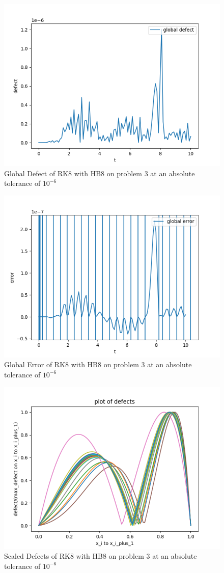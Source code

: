 \documentclass{article}
\begin{document}
\begin{figure}[H]
\centering
\includegraphics[width=0.7\linewidth]{./figures/rk8_with_hb8_p3_global_defect}
\caption{Global Defect of RK8 with HB8 on problem 3 at an absolute tolerance of $10^{-6}$}
\label{fig:rk8_with_hb8_p3_global_defect}
\end{figure}

\begin{figure}[H]
\centering
\includegraphics[width=0.7\linewidth]{./figures/rk8_with_hb8_p3_global_error}
\caption{Global Error of RK8 with HB8 on problem 3 at an absolute tolerance of $10^{-6}$}
\label{fig:rk8_with_hb8_p3_global_error}
\end{figure}

\begin{figure}[H]
\centering
\includegraphics[width=0.7\linewidth]{./figures/rk8_with_hb8_p3_scaled_defects}
\caption{Scaled Defects of RK8 with HB8 on problem 3 at an absolute tolerance of $10^{-6}$}
\label{fig:rk8_with_hb8_p3_scaled_defects}
\end{figure}
\end{document}
